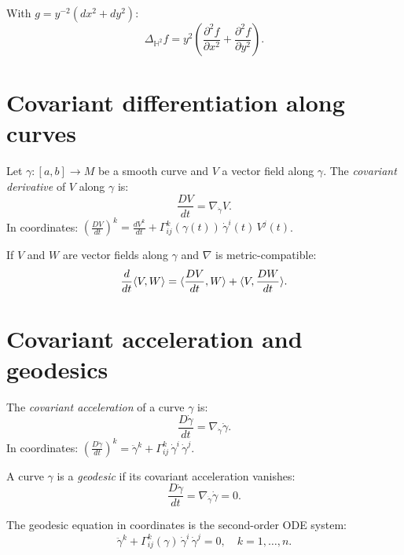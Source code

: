 \begin{example}
With $g = y^{-2}(dx^2 + dy^2)$:
\[
    \Delta_{\mathbb{H}^2} f = y^2\left(\frac{\partial^2 f}{\partial x^2}
    + \frac{\partial^2 f}{\partial y^2}\right).
\]
\end{example}

\section{Covariant differentiation along curves}

\begin{definition}
Let $\gamma : [a,b] \to M$ be a smooth curve and $V$ a vector field along
$\gamma$. The \emph{covariant derivative} of $V$ along $\gamma$ is:
\[
    \frac{DV}{dt} = \nabla_{\dot\gamma} V.
\]
In coordinates: $\displaystyle\left(\frac{DV}{dt}\right)^k
= \frac{dV^k}{dt} + \Gamma^k_{ij}(\gamma(t))\, \dot\gamma^i(t)\, V^j(t)$.
\end{definition}

\begin{proposition}
If $V$ and $W$ are vector fields along $\gamma$ and $\nabla$ is metric-compatible:
\[
    \frac{d}{dt}\langle V, W \rangle = \langle \frac{DV}{dt}, W \rangle + \langle V, \frac{DW}{dt} \rangle.
\]
\end{proposition}

\section{Covariant acceleration and geodesics}

\begin{definition}
The \emph{covariant acceleration} of a curve $\gamma$ is:
\[
    \frac{D\dot\gamma}{dt} = \nabla_{\dot\gamma}\dot\gamma.
\]
In coordinates: $\displaystyle\left(\frac{D\dot\gamma}{dt}\right)^k
= \ddot\gamma^k + \Gamma^k_{ij}\, \dot\gamma^i\, \dot\gamma^j$.
\end{definition}

\begin{definition}[Geodesic]
A curve $\gamma$ is a \emph{geodesic} if its covariant acceleration vanishes:
\[
    \frac{D\dot\gamma}{dt} = \nabla_{\dot\gamma}\dot\gamma = 0.
\]
\end{definition}

The geodesic equation in coordinates is the second-order ODE system:
\[
    \ddot\gamma^k + \Gamma^k_{ij}(\gamma)\, \dot\gamma^i\, \dot\gamma^j = 0,
    \quad k = 1, \ldots, n.
\]

